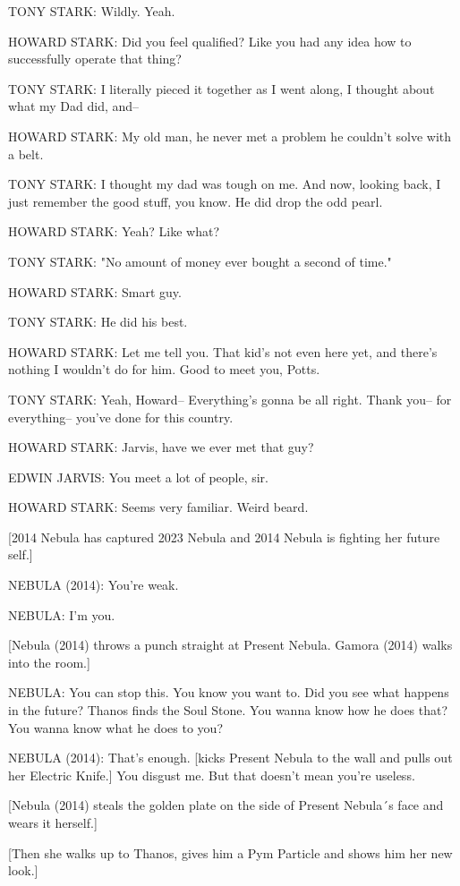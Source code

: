 TONY STARK: Wildly. Yeah.

HOWARD STARK: Did you feel qualified? Like you had any idea how to successfully operate that thing?

TONY STARK: I literally pieced it together as I went along, I thought about what my Dad did, and–

HOWARD STARK: My old man, he never met a problem he couldn't solve with a belt.

TONY STARK: I thought my dad was tough on me. And now, looking back, I just remember the good stuff, you know. He did drop the odd pearl.

HOWARD STARK: Yeah? Like what?

TONY STARK: "No amount of money ever bought a second of time."

HOWARD STARK: Smart guy.

TONY STARK: He did his best.

HOWARD STARK: Let me tell you. That kid's not even here yet, and there's nothing I wouldn't do for him. Good to meet you, Potts.

TONY STARK: Yeah, Howard– Everything's gonna be all right. Thank you– for everything– you've done for this country.

HOWARD STARK: Jarvis, have we ever met that guy?

EDWIN JARVIS: You meet a lot of people, sir.

HOWARD STARK: Seems very familiar. Weird beard.

[2014 Nebula has captured 2023 Nebula and 2014 Nebula is fighting her future self.]

NEBULA (2014): You're weak.

NEBULA: I'm you.

[Nebula (2014) throws a punch straight at Present Nebula. Gamora (2014) walks into the room.]

NEBULA: You can stop this. You know you want to. Did you see what happens in the future? Thanos finds the Soul Stone. You wanna know how he does that? You wanna know what he does to you?

NEBULA (2014): That's enough. [kicks Present Nebula to the wall and pulls out her Electric Knife.] You disgust me. But that doesn't mean you're useless.

[Nebula (2014) steals the golden plate on the side of Present Nebula´s face and wears it herself.]

[Then she walks up to Thanos, gives him a Pym Particle and shows him her new look.]

